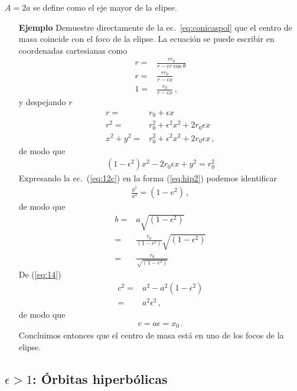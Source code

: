$A=2a$ se define como el eje mayor de la elipse. 

\begin{itemize}
\item[\textbf{Ejemplo}] Demuestre directamente de la ec.~\eqref{eq:conicaspol} que  
el centro de masa coincide con el foco de la elipse.  
La ecuación se puede escribir en coordenadas cartesianas como
\begin{align}
  r=&\frac{r r_0}{r-\epsilon r\cos\theta}\nonumber\\
  r=&\frac{r r_0}{r-\epsilon x}\nonumber\\
  1=&\frac{r_0}{r-\epsilon x}\,,
\end{align}
y despejando $r$
\begin{align}
  r=&r_0+\epsilon x\nonumber\\
  r^2=&r_0^2+\epsilon^2 x^2+2r_0\epsilon x\nonumber\\
  x^2+y^2=&r_0^2+\epsilon^2 x^2+2r_0\epsilon x\,,
\end{align}
de modo que
\begin{align}
  \label{eq:12c}
  (1-\epsilon^2)x^2-2 r_0 \epsilon x +y^2=r_0^2
\end{align}
Expresando la ec.~(\ref{eq:12c}) en la forma (\ref{eq:hip2}) podemos identificar
\begin{align}
  \frac{b^2}{a^2}=(1-e^2)\,,
\end{align}
 de modo que
 \begin{align}
   \label{eq:18}
   b=&a\sqrt{(1-\epsilon^2)}\nonumber\\
   =&\frac{r_0}{(1-\epsilon^2)}\sqrt{(1-\epsilon^2)}\nonumber\\
   =&\frac{r_0}{\sqrt{(1-\epsilon^2)}}
 \end{align}
De (\ref{eq:14})
\begin{align}
  c^2=&a^2-a^2(1-\epsilon^2)\nonumber\\
  =&a^2\epsilon^2\,,
\end{align}
de modo que
\begin{align}
  c=a \epsilon=x_0\,.
\end{align}
Concluimos entonces que el centro de masa está en uno de los focos de la elipse.

\end{itemize}

\subsection{$\epsilon>1$: Órbitas hiperbólicas}

